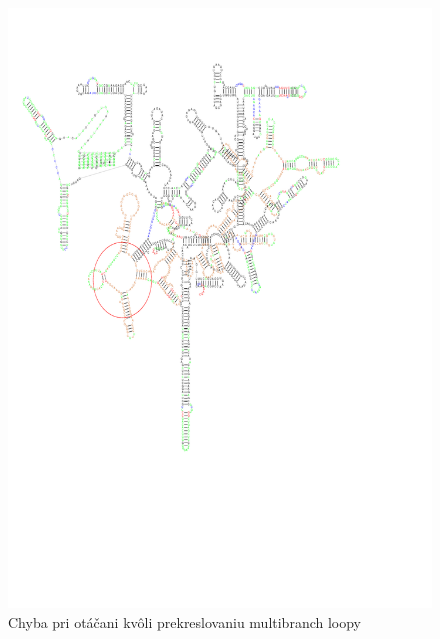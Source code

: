 \begin{figure}
  \centering
  \includegraphics[clip, trim=0.5cm 7cm 4cm 2cm,width=1\textwidth]{../img/chyby/cicadas-sea_scallop}
  \caption{Chyba pri otáčani kvôli prekreslovaniu multibranch loopy}
  \label{obr:chyba_rotacia_multibranch}
\end{figure}









